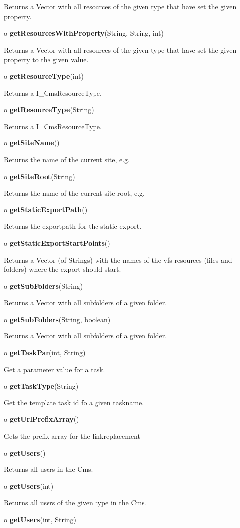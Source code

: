 \begin{description}
Returns a Vector with all resources of the given type that have set the given
property.  
\item o {\bf getResourcesWithProperty}(String, String, int)  

Returns a Vector with all resources of the given type that have set the given
property to the given value.  
\item o {\bf getResourceType}(int)  

Returns a I\_CmsResourceType.  
\item o {\bf getResourceType}(String)  

Returns a I\_CmsResourceType.  
\item o {\bf getSiteName}()  

Returns the name of the current site, e.g.  
\item o {\bf getSiteRoot}(String)  

Returns the name of the current site root, e.g.  
\item o {\bf getStaticExportPath}()  

Returns the exportpath for the static export.  
\item o {\bf getStaticExportStartPoints}()  

Returns a Vector (of Strings) with the names of the vfs resources (files and
folders) where the export should start.  
\item o {\bf getSubFolders}(String)  

Returns a Vector with all subfolders of a given folder.  
\item o {\bf getSubFolders}(String, boolean)  

Returns a Vector with all subfolders of a given folder.  
\item o {\bf getTaskPar}(int, String)  

Get a parameter value for a task.  
\item o {\bf getTaskType}(String)  

Get the template task id fo a given taskname.  
\item o {\bf getUrlPrefixArray}()  

Gets the prefix array for the linkreplacement  
\item o {\bf getUsers}()  

Returns all users in the Cms.  
\item o {\bf getUsers}(int)  

Returns all users of the given type in the Cms.  
\item o {\bf getUsers}(int, String)  


\end{description}
